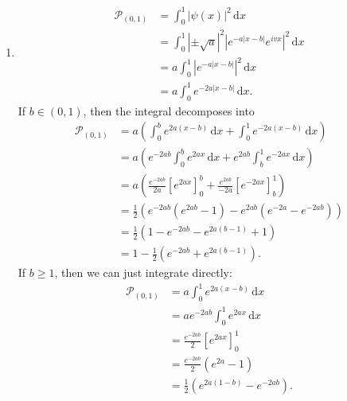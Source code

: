 \documentclass[11pt, letterpaper]{article}
\begin{document}
\begin{enumerate}
\begin{align*}
						   &=b^2+2a\int_{0}^{\infty } u^2e^{-2au}  \,\mathrm{d} u\\
						   &=b^2+2a\left( \left[ \frac{1}{-2a} u^2e^{-2au}  \right]_0^{\infty } -\int_{0}^{\infty } \frac{2}{-2a} ue^{-2au}  \,\mathrm{d}u  \right) \\
						   &=b^2+2\left( \left[ \frac{1}{-2a} ue^{-2au}  \right]_0^{\infty } -\int_{0}^{\infty } \frac{1}{-2a} e^{-2au}  \,\mathrm{d} u \right) \\
						   &=b^2+\frac{1}{a} \int_{0}^{\infty } e^{-2au}  \,\mathrm{d} u\\
						   &=b^2+\frac{1}{-2a^2} \left[ e^{-2au}  \right]_0^{\infty } \\
						   &=b^2-\frac{1}{2a^2} \left( 0-1 \right) \\
						   &=b^2+\frac{1}{2a^2} 
		.\end{align*}
	\item 
		\begin{align*}
			\mathcal{P}_{(0,1)} &=\int_{0}^{1} \left| \psi (x) \right| ^2 \,\mathrm{d} x\\
					    &=\int_{0}^{1} \left| \pm \sqrt{a}  \right| ^2 \left| e^{-a|x-b|} e^{ivx}  \right| ^2 \,\mathrm{d} x\\
					    &=a\int_{0}^{1} \left| e^{-a|x-b|}  \right| ^2 \,\mathrm{d} x\\
					    &=a\int_{0}^{1} e^{-2a|x-b|}  \,\mathrm{d} x
		.\end{align*}
		If $b\in (0,1)$, then the integral decomposes into
		\begin{align*}
			\mathcal{P}_{(0,1)} &=a\left(\int_{0}^{b} e^{2a(x-b)}  \,\mathrm{d} x+\int_{0}^{1} e^{-2a(x-b)}  \,\mathrm{d} x\right)\\
					    &=a\left( e^{-2ab}\int_{0}^{b} e^{2ax}  \,\mathrm{d} x+e^{2ab} \int_{b}^{1} e^{-2ax}  \,\mathrm{d} x \right) \\
					    &=a\left( \frac{e^{-2ab} }{2a} \left[ e^{2ax}  \right]_0^b + \frac{e^{2ab} }{-2a} \left[ e^{-2ax}  \right]_b^1 \right) \\
					    &=\frac{1}{2} \left( e^{-2ab} \left( e^{2ab} -1 \right) -e^{2ab} \left( e^{-2a} -e^{-2ab}  \right)  \right) \\
					    &=\frac{1}{2} \left( 1-e^{-2ab} -e^{2a(b-1)} +1 \right) \\
					    &=1-\frac{1}{2} \left( e^{-2ab} +e^{2a(b-1)}  \right) 
		.\end{align*}
		If $b\geq 1$, then we can just integrate directly:
		\begin{align*}
			\mathcal{P}_{(0,1)} &=a\int_{0}^{1} e^{2a(x-b)}  \,\mathrm{d} x\\
					    &=ae^{-2ab} \int_{0}^{1} e^{2ax}  \,\mathrm{d} x\\
					    &=\frac{e^{-2ab} }{2} \left[ e^{2ax}  \right]_0^1\\
					    &=\frac{e^{-2ab} }{2} \left( e^{2a} -1 \right) \\
					    &=\frac{1}{2} \left( e^{2a(1-b)} -e^{-2ab}  \right) 
		.\end{align*}
		
\end{enumerate}
\end{document}
